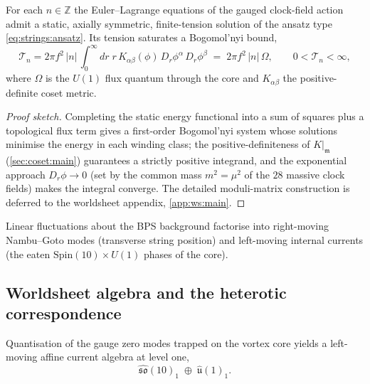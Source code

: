 \begin{theorem}
\label{thm:strings:tension}
For each $n\in\mathbb{Z}$ the Euler--Lagrange equations of the gauged
clock-field action admit a static, axially symmetric, finite-tension
solution of the ansatz type \eqref{eq:strings:ansatz}. Its tension
saturates a Bogomol'nyi bound,
\begin{equation}
  \mathcal{T}_{n}
   = 2\pi f^{2}\,|n|\,
     \int_{0}^{\infty}\!dr\;
     r\,K_{\alpha\beta}(\phi)\,
     D_{r}\phi^{\alpha}\,D_{r}\phi^{\beta}
   \;=\; 2\pi f^{2}\,|n|\,\Omega,
  \qquad 0<\mathcal{T}_{n}<\infty,
  \label{eq:strings:tension}
\end{equation}
where $\Omega$ is the $U(1)$ flux quantum through the core and
$K_{\alpha\beta}$ the positive-definite coset metric.
\end{theorem}

\begin{proof}[Proof sketch]
Completing the static energy functional into a sum of squares plus a
topological flux term gives a first-order Bogomol'nyi system whose
solutions minimise the energy in each winding class; the
positive-definiteness of $K|_{\mathfrak m}$ (\autoref{sec:coset:main})
guarantees a strictly positive integrand, and the exponential approach
$D_{r}\phi\to0$ (set by the common mass $m^{2}=\mu^{2}$ of the $28$
massive clock fields) makes the integral converge. The detailed
moduli-matrix construction is deferred to the worldsheet appendix,
\autoref{app:ws:main}.
\end{proof}

Linear fluctuations about the BPS background factorise into right-moving
Nambu--Goto modes (transverse string position) and left-moving internal
currents (the eaten $\mathrm{Spin}(10)\times U(1)$ phases of the core).

\subsection{Worldsheet algebra and the heterotic correspondence}
\label{sec:strings:worldsheet}

\begin{theorem}
\label{thm:strings:affine}
Quantisation of the gauge zero modes trapped on the vortex core yields a
left-moving affine current algebra at level one,
\begin{equation}
  \widehat{\mathfrak{so}}(10)_{1}\;\oplus\;\widehat{\mathfrak u}(1)_{1}.
  \label{eq:strings:affine}
\end{equation}
\end{theorem}

